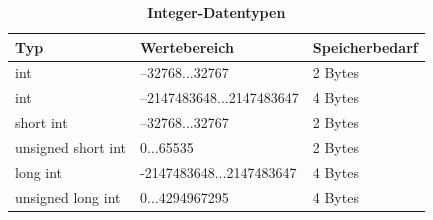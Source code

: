 	\begin{table}[!h]%
		\centering
		\caption{\textbf{Integer-Datentypen}}
		\label{tab:Integer-Datentypen}
		\begin{tabular}{@{}lll@{}}
		\toprule
		\textbf{Typ}       & \textbf{Wertebereich}    & \textbf{Speicherbedarf} \\ \midrule
		int                & –32768...32767           & 2 Bytes                 \\
		int                & –2147483648...2147483647 & 4 Bytes                 \\
		short int          & –32768...32767           & 2 Bytes                 \\
		unsigned short int & 0...65535                & 2 Bytes                 \\
		long int           & -2147483648...2147483647 & 4 Bytes                 \\
		unsigned long int  & 0...4294967295           & 4 Bytes                 \\ \bottomrule
		\end{tabular}%
	\end{table}


